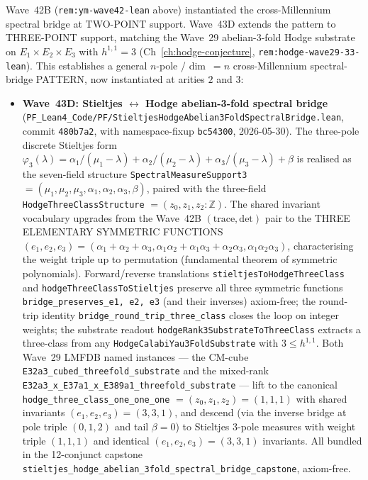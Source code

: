 \begin{remark}\label{rem:ym-wave43d-lean}
Wave~42B (\texttt{rem:ym-wave42-lean} above) instantiated the cross-Millennium spectral bridge at TWO-POINT support. Wave~43D extends the pattern to THREE-POINT support, matching the Wave~29 abelian-3-fold Hodge substrate on $E_1 \times E_2 \times E_3$ with $h^{1,1} = 3$ (Ch~\ref{ch:hodge-conjecture}, \texttt{rem:hodge-wave29-33-lean}). This establishes a general $n$-pole / dim~$=n$ cross-Millennium spectral-bridge PATTERN, now instantiated at arities $2$ and $3$:
\begin{itemize}
  \item \textbf{Wave~43D: Stieltjes $\leftrightarrow$ Hodge abelian-3-fold spectral bridge} (\texttt{PF\_Lean4\_Code/PF/StieltjesHodgeAbelian3FoldSpectralBridge.lean}, commit \texttt{480b7a2}, with namespace-fixup \texttt{bc54300}, 2026-05-30). The three-pole discrete Stieltjes form $\varphi_3(\lambda) = \alpha_1/(\mu_1 - \lambda) + \alpha_2/(\mu_2 - \lambda) + \alpha_3/(\mu_3 - \lambda) + \beta$ is realised as the seven-field structure \texttt{SpectralMeasureSupport3} $= (\mu_1, \mu_2, \mu_3, \alpha_1, \alpha_2, \alpha_3, \beta)$, paired with the three-field \texttt{HodgeThreeClassStructure} $= (z_0, z_1, z_2 : \mathbb{Z})$. The shared invariant vocabulary upgrades from the Wave~42B $(\mathrm{trace}, \mathrm{det})$ pair to the THREE ELEMENTARY SYMMETRIC FUNCTIONS $(e_1, e_2, e_3) = (\alpha_1 + \alpha_2 + \alpha_3, \alpha_1\alpha_2 + \alpha_1\alpha_3 + \alpha_2\alpha_3, \alpha_1\alpha_2\alpha_3)$, characterising the weight triple up to permutation (fundamental theorem of symmetric polynomials). Forward/reverse translations \texttt{stieltjesToHodgeThreeClass} and \texttt{hodgeThreeClassToStieltjes} preserve all three symmetric functions \texttt{bridge\_preserves\_e1,~e2,~e3} (and their inverses) axiom-free; the round-trip identity \texttt{bridge\_round\_trip\_three\_class} closes the loop on integer weights; the substrate readout \texttt{hodgeRank3SubstrateToThreeClass} extracts a three-class from any \texttt{HodgeCalabiYau3FoldSubstrate} with $3 \leq h^{1,1}$. Both Wave~29 LMFDB named instances --- the CM-cube \texttt{E32a3\_cubed\_threefold\_substrate} and the mixed-rank \texttt{E32a3\_x\_E37a1\_x\_E389a1\_threefold\_substrate} --- lift to the canonical \texttt{hodge\_three\_class\_one\_one\_one} $= (z_0, z_1, z_2) = (1, 1, 1)$ with shared invariants $(e_1, e_2, e_3) = (3, 3, 1)$, and descend (via the inverse bridge at pole triple $(0, 1, 2)$ and tail $\beta = 0$) to Stieltjes 3-pole measures with weight triple $(1, 1, 1)$ and identical $(e_1, e_2, e_3) = (3, 3, 1)$ invariants. All bundled in the 12-conjunct capstone \texttt{stieltjes\_hodge\_abelian\_3fold\_spectral\_bridge\_capstone}, axiom-free.

\end{itemize}
\end{remark}
